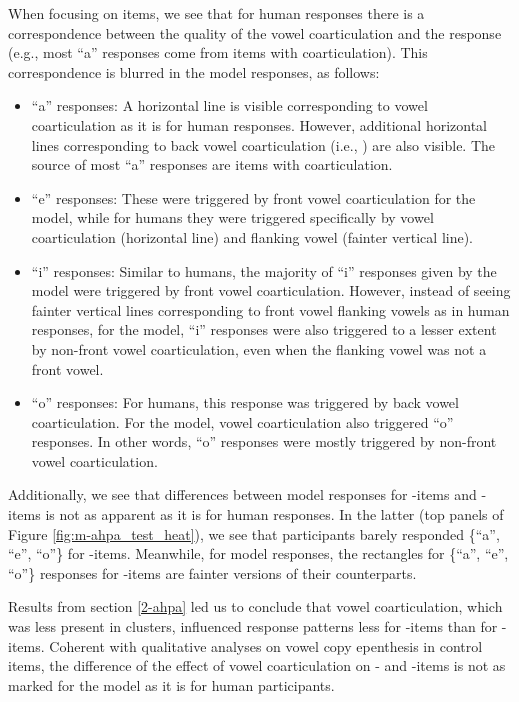 {When focusing on  items, we see that for human responses there is a correspondence between the quality of the vowel coarticulation and the response (e.g., most ``a'' responses come from items with \textipa{[a]} coarticulation). This correspondence is blurred in the model responses, as follows:
\begin{itemize}
    \item ``a'' responses: A horizontal line is visible corresponding to \textipa{[a]} vowel coarticulation as it is for human responses. However, additional horizontal lines corresponding to back vowel coarticulation (i.e., \textipa{[o, u]}) are also visible. The source of most ``a'' responses are items with \textipa{[u]} coarticulation.
    \item ``e'' responses: These were triggered by front vowel coarticulation for the model, while for humans they were triggered specifically by \textipa{[e]} vowel coarticulation (horizontal line) and  flanking vowel (fainter vertical line).
    \item ``i'' responses: Similar to humans, the majority of ``i'' responses given by the model were triggered by front vowel coarticulation. However, instead of seeing fainter vertical lines corresponding to front vowel flanking vowels as in human responses, for the model, ``i'' responses were also triggered to a lesser extent by non-front vowel coarticulation, even when the flanking vowel was not a front vowel.
    \item ``o'' responses: For humans, this response was triggered by back vowel coarticulation. For the model, \textipa{[a]} vowel coarticulation also triggered ``o'' responses. In other words, ``o'' responses were mostly triggered by non-front vowel coarticulation.
  
  \end{itemize}

  Additionally, we see that differences between model responses for -items and -items is not as apparent as it is for human responses. In the latter (top panels of Figure \ref{fig:m-ahpa_test_heat}), we see that participants barely responded \{``a'', ``e'', ``o''\} for -items. Meanwhile, for model responses, the rectangles for \{``a'', ``e'', ``o''\} responses for -items are fainter versions of their  counterparts.
  
  Results from section \ref{2-ahpa} led us to conclude that vowel coarticulation, which was less present in  clusters, influenced response patterns less for -items than for -items.
  Coherent with qualitative analyses on vowel copy epenthesis in control items, the difference of the effect of vowel coarticulation on - and -items is not as marked for the model as it is for human participants. 

}

